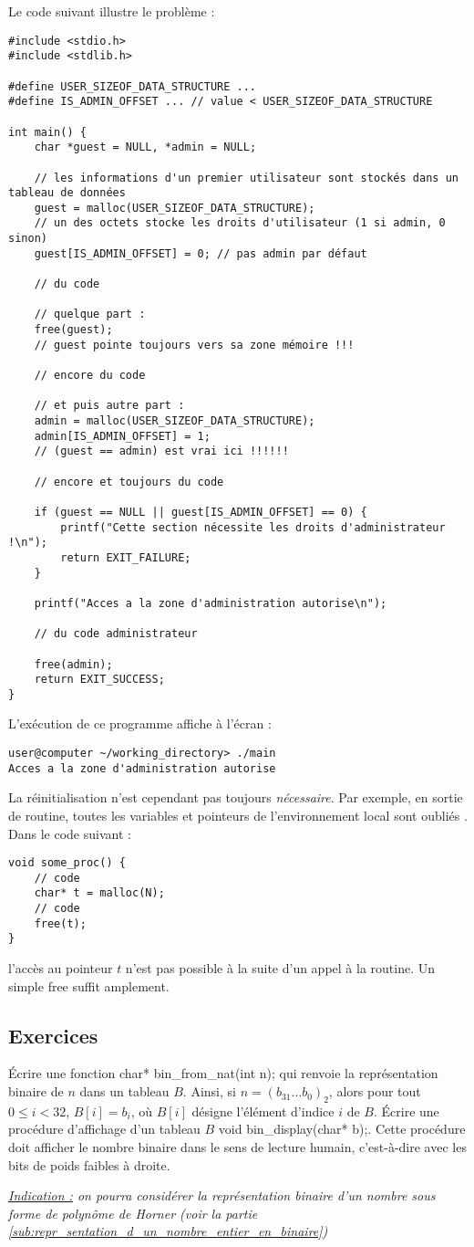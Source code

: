 \documentclass[../../../main.tex]{subfiles}
\begin{document}
Le code suivant illustre le problème :
\begin{verbatim}
#include <stdio.h>
#include <stdlib.h>

#define USER_SIZEOF_DATA_STRUCTURE ...
#define IS_ADMIN_OFFSET ... // value < USER_SIZEOF_DATA_STRUCTURE

int main() {
	char *guest = NULL, *admin = NULL;

	// les informations d'un premier utilisateur sont stockés dans un tableau de données
	guest = malloc(USER_SIZEOF_DATA_STRUCTURE);
	// un des octets stocke les droits d'utilisateur (1 si admin, 0 sinon)
	guest[IS_ADMIN_OFFSET] = 0; // pas admin par défaut

	// du code

	// quelque part :
	free(guest);
	// guest pointe toujours vers sa zone mémoire !!!

	// encore du code
	
	// et puis autre part :
	admin = malloc(USER_SIZEOF_DATA_STRUCTURE);
	admin[IS_ADMIN_OFFSET] = 1;
	// (guest == admin) est vrai ici !!!!!!

	// encore et toujours du code

	if (guest == NULL || guest[IS_ADMIN_OFFSET] == 0) {
		printf("Cette section nécessite les droits d'administrateur !\n");
		return EXIT_FAILURE;
	}
	
	printf("Acces a la zone d'administration autorise\n");

	// du code administrateur

	free(admin);
	return EXIT_SUCCESS;
}
\end{verbatim}
L'exécution de ce programme affiche à l'écran :
\begin{verbatim}
user@computer ~/working_directory> ./main
Acces a la zone d'administration autorise
\end{verbatim}
La réinitialisation n'est cependant pas toujours \textit{nécessaire}. Par exemple, en sortie de routine, toutes les variables et pointeurs de l'environnement local sont \og oubliés \fg. Dans le code suivant :
\begin{verbatim}
void some_proc() {
	// code
	char* t = malloc(N);
	// code
	free(t);
}
\end{verbatim}
l'accès au pointeur $t$ n'est pas possible à la suite d'un appel à la routine. Un simple \textsf{free} suffit amplement.
\subsection{Exercices}
Écrire une fonction \textsf{char* bin\_from\_nat(int n);} qui renvoie la représentation binaire de $n$ dans un tableau $B$. Ainsi, si $n = (b_{31}\dots b_{0})_2$, alors pour tout $0 \leq i < 32$, $B[i] = b_i$, où $B[i]$ désigne l'élément d'indice $i$ de $B$. Écrire une procédure d'affichage d'un tableau $B$ \textsf{void bin\_display(char* b);}. Cette procédure doit afficher le nombre binaire dans le sens de lecture humain, c'est-à-dire avec les bits de poids faibles à droite.

\textit{\underline{Indication :} on pourra considérer la représentation binaire d'un nombre sous forme de polynôme de Horner (voir la partie \ref{sub:repr_sentation_d_un_nombre_entier_en_binaire})}
\end{document}
